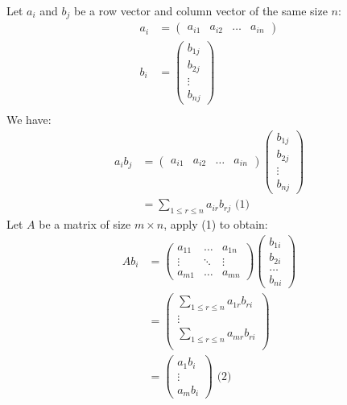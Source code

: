 
  \item Let $a_i$ and $b_j$ be a row vector and column vector of the same size $n$:
    \begin{align*}
      a_i &= \begin{pmatrix}
        a_{i1} & a_{i2} & \dots & a_{in} 
      \end{pmatrix} \\
      b_i &= \begin{pmatrix}
        b_{1j} \\ b_{2j} \\ \vdots \\ b_{nj}
      \end{pmatrix} \\
    \end{align*}
    We have:
    \begin{align*}
      a_i b_j &= 
      \begin{pmatrix}
        a_{i1} & a_{i2} & \dots & a_{in}
      \end{pmatrix}
      \begin{pmatrix}
        b_{1j} \\ b_{2j} \\ \vdots \\ b_{nj}
      \end{pmatrix} \\
      &= \sum_{1 \le r \le n} a_{ir}b_{rj} \text{ (1) }
    \end{align*}
     Let $A$ be a matrix of size $m \times n$, apply (1) to obtain:
    \begin{align*}
      Ab_i &= \begin{pmatrix}
        a_{11} & \dots & a_{1n} \\
        \vdots & \ddots & \vdots \\
        a_{m1} & \dots & a_{mn}
      \end{pmatrix}
      \begin{pmatrix}
        b_{1i} \\ b_{2i} \\ \dots \\ b_{ni}
      \end{pmatrix} \\
      &= \begin{pmatrix}
        \sum_{1 \le r \le n} a_{1r}b_{ri} \\
        \vdots \\
        \sum_{1 \le r \le n} a_{mr}b_{ri} \\
      \end{pmatrix}\\
      &= \begin{pmatrix}
        a_1 b_i \\
        \vdots \\
        a_m b_i
      \end{pmatrix} \text{ (2)}
    \end{align*}
